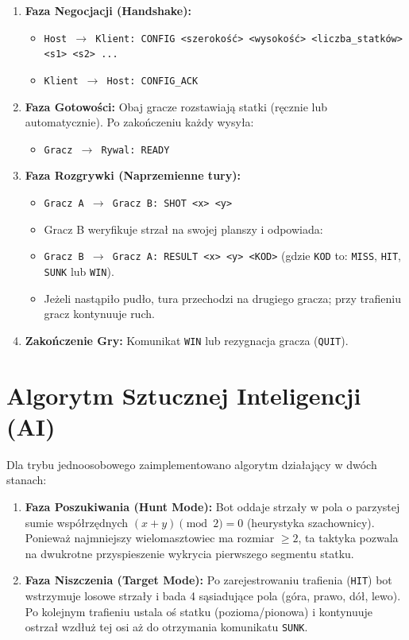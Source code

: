 \documentclass[11pt,a4paper]{article}
\begin{document}
\begin{enumerate}
    \item \textbf{Faza Negocjacji (Handshake):}
    \begin{itemize}[noitemsep]
        \item \texttt{Host $\rightarrow$ Klient: CONFIG <szerokość> <wysokość> <liczba\_statków> <s1> <s2> ...}
        \item \texttt{Klient $\rightarrow$ Host: CONFIG\_ACK}
    \end{itemize}
    \item \textbf{Faza Gotowości:}
    Obaj gracze rozstawiają statki (ręcznie lub automatycznie). Po zakończeniu każdy wysyła:
    \begin{itemize}[noitemsep]
        \item \texttt{Gracz $\rightarrow$ Rywal: READY}
    \end{itemize}
    \item \textbf{Faza Rozgrywki (Naprzemienne tury):}
    \begin{itemize}[noitemsep]
        \item \texttt{Gracz A $\rightarrow$ Gracz B: SHOT <x> <y>}
        \item Gracz B weryfikuje strzał na swojej planszy i odpowiada:
        \item \texttt{Gracz B $\rightarrow$ Gracz A: RESULT <x> <y> <KOD>} (gdzie \texttt{KOD} to: \texttt{MISS}, \texttt{HIT}, \texttt{SUNK} lub \texttt{WIN}).
        \item Jeżeli nastąpiło pudło, tura przechodzi na drugiego gracza; przy trafieniu gracz kontynuuje ruch.
    \end{itemize}
    \item \textbf{Zakończenie Gry:}
    Komunikat \texttt{WIN} lub rezygnacja gracza (\texttt{QUIT}).
\end{enumerate}

\section{Algorytm Sztucznej Inteligencji (AI)}
Dla trybu jednoosobowego zaimplementowano algorytm działający w dwóch stanach:
\begin{enumerate}
    \item \textbf{Faza Poszukiwania (Hunt Mode):} Bot oddaje strzały w pola o parzystej sumie współrzędnych $(x + y) \pmod 2 = 0$ (heurystyka szachownicy). Ponieważ najmniejszy wielomasztowiec ma rozmiar $\ge 2$, ta taktyka pozwala na dwukrotne przyspieszenie wykrycia pierwszego segmentu statku.
    \item \textbf{Faza Niszczenia (Target Mode):} Po zarejestrowaniu trafienia (\texttt{HIT}) bot wstrzymuje losowe strzały i bada 4 sąsiadujące pola (góra, prawo, dół, lewo). Po kolejnym trafieniu ustala oś statku (pozioma/pionowa) i kontynuuje ostrzał wzdłuż tej osi aż do otrzymania komunikatu \texttt{SUNK}.
\end{enumerate}
\end{document}
